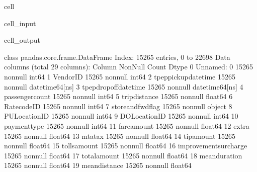 \documentclass[letterpaper,10pt,english]{sphinxmanual}
\begin{document}
\begin{sphinxuseclass}{cell}
\begin{sphinxuseclass}{cell_input}
\begin{sphinxVerbatim}[commandchars=\\\{\}]
\end{sphinxVerbatim}

\end{sphinxuseclass}
\begin{sphinxuseclass}{cell_output}
\begin{sphinxVerbatim}[commandchars=\\\{\}]
\PYGZlt{}class \PYGZsq{}pandas.core.frame.DataFrame\PYGZsq{}\PYGZgt{}
Index: 15265 entries, 0 to 22698
Data columns (total 29 columns):
 \PYGZsh{}   Column                 Non\PYGZhy{}Null Count  Dtype         
\PYGZhy{}\PYGZhy{}\PYGZhy{}  \PYGZhy{}\PYGZhy{}\PYGZhy{}\PYGZhy{}\PYGZhy{}\PYGZhy{}                 \PYGZhy{}\PYGZhy{}\PYGZhy{}\PYGZhy{}\PYGZhy{}\PYGZhy{}\PYGZhy{}\PYGZhy{}\PYGZhy{}\PYGZhy{}\PYGZhy{}\PYGZhy{}\PYGZhy{}\PYGZhy{}  \PYGZhy{}\PYGZhy{}\PYGZhy{}\PYGZhy{}\PYGZhy{}         
 0   Unnamed: 0             15265 non\PYGZhy{}null  int64         
 1   VendorID               15265 non\PYGZhy{}null  int64         
 2   tpep\PYGZus{}pickup\PYGZus{}datetime   15265 non\PYGZhy{}null  datetime64[ns]
 3   tpep\PYGZus{}dropoff\PYGZus{}datetime  15265 non\PYGZhy{}null  datetime64[ns]
 4   passenger\PYGZus{}count        15265 non\PYGZhy{}null  int64         
 5   trip\PYGZus{}distance          15265 non\PYGZhy{}null  float64       
 6   RatecodeID             15265 non\PYGZhy{}null  int64         
 7   store\PYGZus{}and\PYGZus{}fwd\PYGZus{}flag     15265 non\PYGZhy{}null  object        
 8   PULocationID           15265 non\PYGZhy{}null  int64         
 9   DOLocationID           15265 non\PYGZhy{}null  int64         
 10  payment\PYGZus{}type           15265 non\PYGZhy{}null  int64         
 11  fare\PYGZus{}amount            15265 non\PYGZhy{}null  float64       
 12  extra                  15265 non\PYGZhy{}null  float64       
 13  mta\PYGZus{}tax                15265 non\PYGZhy{}null  float64       
 14  tip\PYGZus{}amount             15265 non\PYGZhy{}null  float64       
 15  tolls\PYGZus{}amount           15265 non\PYGZhy{}null  float64       
 16  improvement\PYGZus{}surcharge  15265 non\PYGZhy{}null  float64       
 17  total\PYGZus{}amount           15265 non\PYGZhy{}null  float64       
 18  mean\PYGZus{}duration          15265 non\PYGZhy{}null  float64       
 19  mean\PYGZus{}distance          15265 non\PYGZhy{}null  float64       

\end{sphinxVerbatim}
\end{sphinxuseclass}
\end{sphinxuseclass}
\end{document}
